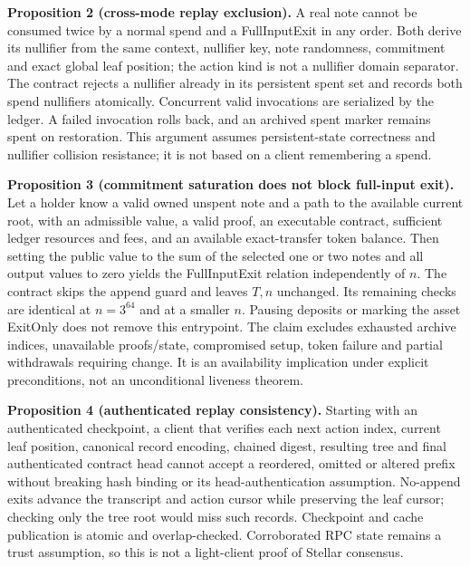 \documentclass[11pt,letterpaper]{article}
\begin{document}
\textbf{Proposition 2 (cross-mode replay exclusion).} A real note cannot
be consumed twice by a normal spend and a FullInputExit in any order.
Both derive its nullifier from the same context, nullifier key, note
randomness, commitment and exact global leaf position; the action kind
is not a nullifier domain separator. The contract rejects a nullifier
already in its persistent spent set and records both spend nullifiers
atomically. Concurrent valid invocations are serialized by the ledger. A
failed invocation rolls back, and an archived spent marker remains spent
on restoration. This argument assumes persistent-state correctness and
nullifier collision resistance; it is not based on a client remembering
a spend.

\textbf{Proposition 3 (commitment saturation does not block full-input
exit).} Let a holder know a valid owned unspent note and a path to the
available current root, with an admissible value, a valid proof, an
executable contract, sufficient ledger resources and fees, and an
available exact-transfer token balance. Then setting the public value to
the sum of the selected one or two notes and all output values to zero
yields the FullInputExit relation independently of \(n\). The contract
skips the append guard and leaves \(T,n\) unchanged. Its remaining
checks are identical at \(n=3^{64}\) and at a smaller \(n\). Pausing
deposits or marking the asset ExitOnly does not remove this entrypoint.
The claim excludes exhausted archive indices, unavailable
proofs/\allowbreak{}state, compromised setup, token failure and partial
withdrawals requiring change. It is an availability implication under
explicit preconditions, not an unconditional liveness theorem.

\textbf{Proposition 4 (authenticated replay consistency).} Starting with
an authenticated checkpoint, a client that verifies each next action
index, current leaf position, canonical record encoding, chained digest,
resulting tree and final authenticated contract head cannot accept a
reordered, omitted or altered prefix without breaking hash binding or
its head-authentication assumption. No-append exits advance the
transcript and action cursor while preserving the leaf cursor; checking
only the tree root would miss such records. Checkpoint and cache
publication is atomic and overlap-checked. Corroborated RPC state
remains a trust assumption, so this is not a light-client proof of
Stellar consensus.
\end{document}
